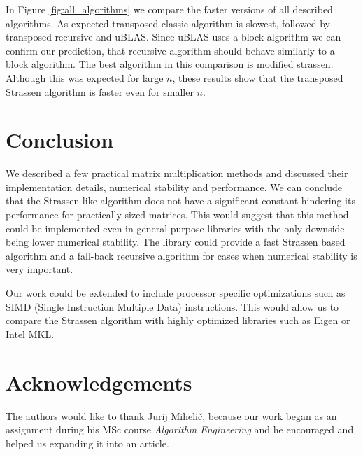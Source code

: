 \documentclass[a4paper,11pt]{article}
\begin{document}
In Figure \ref{fig:all_algorithms} we compare the faster versions of all described algorithms. As expected transposed classic algorithm is slowest, followed by transposed recursive and uBLAS. Since uBLAS uses a block algorithm we can confirm our prediction, that recursive algorithm should behave similarly to a block algorithm. The best algorithm in this comparison is modified strassen. 
Although this was expected for large $n$, these results show that the transposed Strassen algorithm is faster even for smaller $n$.

\section{Conclusion}
We described a few practical matrix multiplication methods and discussed their implementation details, numerical stability and performance. We can conclude that the Strassen-like algorithm does not have a significant constant hindering its performance for practically sized matrices. This would suggest that this method could be implemented even in general purpose libraries with the only downside being lower numerical stability. The library could provide a fast Strassen based algorithm and a fall-back recursive algorithm for cases when numerical stability is very important. 

Our work could be extended to include processor specific optimizations such as SIMD (Single Instruction Multiple Data) instructions. This would allow us to compare the Strassen algorithm with highly optimized libraries such as Eigen or Intel MKL. 
\balance


\section*{Acknowledgements}
The authors would like to thank Jurij Mihelič, because our work began as an assignment during his MSc course \textit{Algorithm Engineering} and he encouraged and helped us expanding it into an article.



\end{document}
